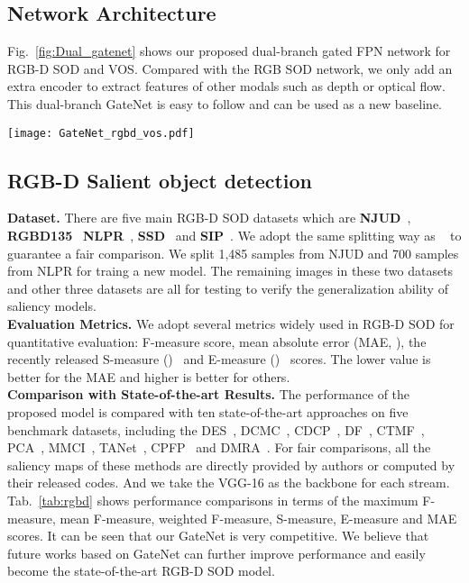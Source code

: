 \documentclass[runningheads]{llncs}
\begin{document}
	\subsection{Network Architecture}
	Fig.~\ref{fig:Dual_gatenet} shows our proposed dual-branch gated FPN network for RGB-D SOD and VOS. Compared with the RGB SOD network, we only add an extra encoder to extract features of other modals such as depth or optical flow. This dual-branch GateNet is easy to follow and can be used as a new baseline.
	\begin{figure*}
		\texttt{[image: GateNet\_rgbd\_vos.pdf]}\\ \centering
		\caption{Network pipeline.} 		
		\label{fig:Dual_gatenet}
\end{figure*} 
	
	\subsection{RGB-D Salient object detection}
	\textbf{Dataset.} There are five main RGB-D SOD datasets which are \textbf{NJUD}~\cite{NJU2000}, \textbf{RGBD135}~\cite{RGBD135} \textbf{NLPR}~\cite{early_fusion_1}, \textbf{SSD}~\cite{SSD} and \textbf{SIP}~\cite{SIP}. 
	We adopt the same splitting way as ~\cite{PCA,MMCI,CTMF,CPFP,DMRA} to guarantee a fair comparison. We split 1,485 samples from NJUD and 700 samples from NLPR for traing a new model. The remaining images in these two datasets and other three datasets are all for testing to verify the generalization ability of saliency models.
	\\
	\textbf{Evaluation Metrics.} We adopt several metrics widely used in RGB-D SOD for quantitative evaluation: F-measure score, mean absolute error (MAE, ), the recently released S-measure ()~\cite{S-m} and E-measure ()~\cite{Em} scores. The lower value is better for the MAE and higher is better for others.
	\\
	\textbf{Comparison with State-of-the-art Results.}
	The performance of the proposed model is compared
	with ten state-of-the-art approaches on five benchmark datasets, including the DES~\cite{RGBD135}, DCMC~\cite{DCMC}, CDCP~\cite{CDCP}, DF~\cite{DF}, CTMF~\cite{CTMF}, PCA~\cite{PCA}, MMCI~\cite{MMCI}, TANet~\cite{TANet}, CPFP~\cite{CPFP} and DMRA~\cite{DMRA}. For fair comparisons, all the saliency maps of these methods are directly provided by authors or computed by their released codes. And we take the VGG-16 as the backbone for each stream. 
	Tab.~\ref{tab:rgbd} shows performance comparisons in terms of the maximum F-measure, mean F-measure, weighted F-measure, S-measure, E-measure and MAE scores. It can be seen that our GateNet is very competitive. We believe that future works based on GateNet can further improve performance and easily become the state-of-the-art RGB-D SOD model.
\end{document}
